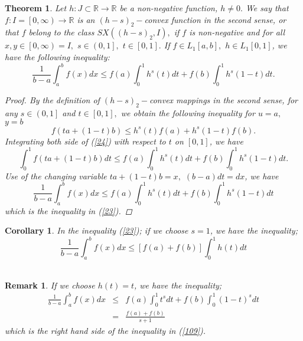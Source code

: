 \documentclass{amsart}
\newtheorem{theorem}{Theorem}
\theoremstyle{plain}
\newtheorem{corollary}{Corollary}
\newtheorem{remark}{Remark}
\numberwithin{equation}{section}
\begin{document}
\begin{theorem}
\label{th1} Let $h:J\subset 
\mathbb{R}
\rightarrow 
\mathbb{R}
$ be a non-negative function, $h\neq 0.$ We say that $f:I=\left[ 0,\infty
\right) \rightarrow 
\mathbb{R}
$ is an $(h-s)_{2}-$convex function in the second sense, or that $f$ belong
to the class $SX(\left( h-s\right) _{2},I),$ if $f$ is non-negative and for
all $x,y\in \left[ 0,\infty \right) =I,$ $s\in \left( 0,1\right] ,$ $t\in \left[ 0,1\right] .$ If $f\in L_{1}\left[ a,b\right] ,$ $h\in L_{1}\left[ 0,1\right] $, we have the following inequality:\begin{equation}
\frac{1}{b-a}\int_{a}^{b}f(x)dx\leq f(a)\int_{0}^{1}h^{s}\left( t\right)
dt+f(b)\int_{0}^{1}h^{s}\left( 1-t\right) dt.  \label{23}
\end{equation}

\begin{proof}
By the definition of $(h-s)_{2}-$convex mappings in the second sense, for
any $s\in \left( 0,1\right] $ and $t\in \left[ 0,1\right] ,$ we obtain the
following inequality for $u=a,$ $y=b$\begin{equation}
f(ta+(1-t)b)\leq h^{s}(t)f(a)+h^{s}(1-t)f(b).  \label{24}
\end{equation}Integrating both side of (\ref{24}) with respect to $t$ on $\left[ 0,1\right]
$, we have 
\begin{equation*}
\int_{0}^{1}f(ta+(1-t)b)dt\leq f(a)\int_{0}^{1}h^{s}\left( t\right)
dt+f(b)\int_{0}^{1}h^{s}\left( 1-t\right) dt.
\end{equation*}Use of the changing variable $ta+(1-t)b=x,$ $(b-a)dt=dx$, we have\begin{equation*}
\frac{1}{b-a}\int_{a}^{b}f(x)dx\leq f(a)\int_{0}^{1}h^{s}\left( t\right)
dt+f(b)\int_{0}^{1}h^{s}\left( 1-t\right) dt
\end{equation*}which is the inequality in (\ref{23}).
\end{proof}
\end{theorem}

\begin{corollary}
In the inequality (\ref{23}); \textit{if we choose }$s=1$\textit{, we have
the inequality;}\begin{equation*}
\frac{1}{b-a}\int_{a}^{b}f(x)dx\leq \left[ f(a)+f(b)\right]
\int_{0}^{1}h\left( t\right) dt
\end{equation*}\textit{\ }
\end{corollary}

\begin{remark}
\textit{If we choose }$h(t)=t$\textit{, we have the inequality;}\begin{eqnarray*}
\frac{1}{b-a}\int_{a}^{b}f(x)dx &\leq
&f(a)\int_{0}^{1}t^{s}dt+f(b)\int_{0}^{1}\left( 1-t\right) ^{s}dt \\
&=&\frac{f(a)+f(b)}{s+1}
\end{eqnarray*}which is the right hand side of the inequality in (\ref{109}).
\end{remark}
\end{document}
